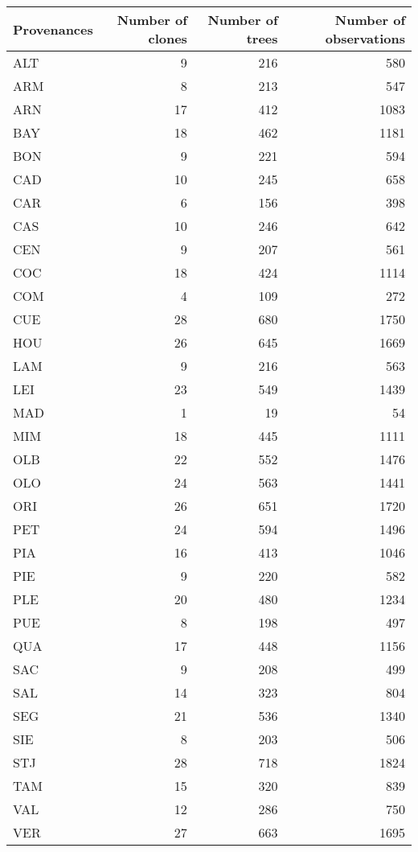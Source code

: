 \begin{table}[ht]
\centering
\begin{tabular}{lrrr}
  \hline
Provenances & Number of clones & Number of trees & Number of observations \\ 
  \hline
ALT & 9 & 216 & 580 \\ 
  ARM & 8 & 213 & 547 \\ 
  ARN & 17 & 412 & 1083 \\ 
  BAY & 18 & 462 & 1181 \\ 
  BON & 9 & 221 & 594 \\ 
  CAD & 10 & 245 & 658 \\ 
  CAR & 6 & 156 & 398 \\ 
  CAS & 10 & 246 & 642 \\ 
  CEN & 9 & 207 & 561 \\ 
  COC & 18 & 424 & 1114 \\ 
  COM & 4 & 109 & 272 \\ 
  CUE & 28 & 680 & 1750 \\ 
  HOU & 26 & 645 & 1669 \\ 
  LAM & 9 & 216 & 563 \\ 
  LEI & 23 & 549 & 1439 \\ 
  MAD & 1 & 19 & 54 \\ 
  MIM & 18 & 445 & 1111 \\ 
  OLB & 22 & 552 & 1476 \\ 
  OLO & 24 & 563 & 1441 \\ 
  ORI & 26 & 651 & 1720 \\ 
  PET & 24 & 594 & 1496 \\ 
  PIA & 16 & 413 & 1046 \\ 
  PIE & 9 & 220 & 582 \\ 
  PLE & 20 & 480 & 1234 \\ 
  PUE & 8 & 198 & 497 \\ 
  QUA & 17 & 448 & 1156 \\ 
  SAC & 9 & 208 & 499 \\ 
  SAL & 14 & 323 & 804 \\ 
  SEG & 21 & 536 & 1340 \\ 
  SIE & 8 & 203 & 506 \\ 
  STJ & 28 & 718 & 1824 \\ 
  TAM & 15 & 320 & 839 \\ 
  VAL & 12 & 286 & 750 \\ 
  VER & 27 & 663 & 1695 \\ 
   \hline
\end{tabular}
\end{table}
